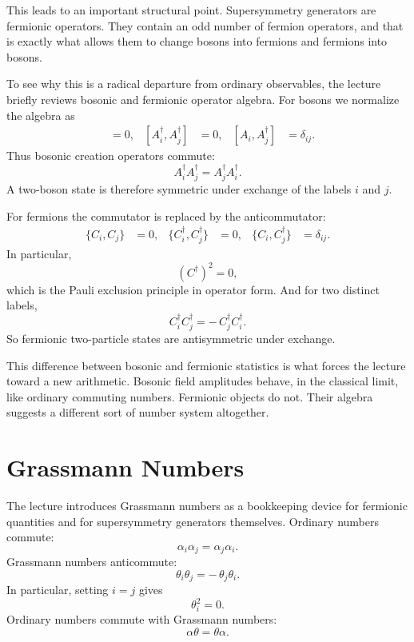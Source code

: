 This leads to an important structural point. Supersymmetry generators are fermionic operators. They contain an odd number of fermion operators, and that is exactly what allows them to change bosons into fermions and fermions into bosons.

To see why this is a radical departure from ordinary observables, the lecture briefly reviews bosonic and fermionic operator algebra. For bosons we normalize the algebra as
\begin{align}
[A_i,A_j] &= 0, &
[A_i^\dagger,A_j^\dagger] &= 0, &
[A_i,A_j^\dagger] &= \delta_{ij}.
\end{align}
Thus bosonic creation operators commute:
\begin{equation}
A_i^\dagger A_j^\dagger = A_j^\dagger A_i^\dagger.
\end{equation}
A two-boson state is therefore symmetric under exchange of the labels \(i\) and \(j\).

For fermions the commutator is replaced by the anticommutator:
\begin{align}
\{C_i,C_j\} &= 0, &
\{C_i^\dagger,C_j^\dagger\} &= 0, &
\{C_i,C_j^\dagger\} &= \delta_{ij}.
\end{align}
In particular,
\begin{equation}
(C^\dagger)^2=0,
\end{equation}
which is the Pauli exclusion principle in operator form. And for two distinct labels,
\begin{equation}
C_i^\dagger C_j^\dagger = -\,C_j^\dagger C_i^\dagger.
\end{equation}
So fermionic two-particle states are antisymmetric under exchange.

This difference between bosonic and fermionic statistics is what forces the lecture toward a new arithmetic. Bosonic field amplitudes behave, in the classical limit, like ordinary commuting numbers. Fermionic objects do not. Their algebra suggests a different sort of number system altogether.

\section{Grassmann Numbers}

The lecture introduces Grassmann numbers as a bookkeeping device for fermionic quantities and for supersymmetry generators themselves. Ordinary numbers commute:
\begin{equation}
\alpha_i\alpha_j=\alpha_j\alpha_i.
\end{equation}
Grassmann numbers anticommute:
\begin{equation}
\theta_i\theta_j=-\,\theta_j\theta_i.
\end{equation}
In particular, setting \(i=j\) gives
\begin{equation}
\theta_i^2=0.
\end{equation}
Ordinary numbers commute with Grassmann numbers:
\begin{equation}
\alpha\theta=\theta\alpha.
\end{equation}

